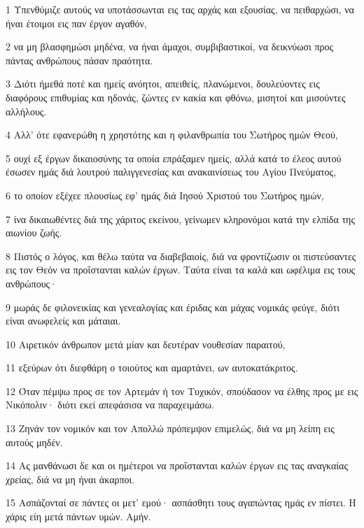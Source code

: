 \par 1 Υπενθύμιζε αυτούς να υποτάσσωνται εις τας αρχάς και εξουσίας, να πειθαρχώσι, να ήναι έτοιμοι εις παν έργον αγαθόν,
\par 2 να μη βλασφημώσι μηδένα, να ήναι άμαχοι, συμβιβαστικοί, να δεικνύωσι προς πάντας ανθρώπους πάσαν πραότητα.
\par 3 Διότι ήμεθά ποτέ και ημείς ανόητοι, απειθείς, πλανώμενοι, δουλεύοντες εις διαφόρους επιθυμίας και ηδονάς, ζώντες εν κακία και φθόνω, μισητοί και μισούντες αλλήλους.
\par 4 Αλλ' ότε εφανερώθη η χρηστότης και η φιλανθρωπία του Σωτήρος ημών Θεού,
\par 5 ουχί εξ έργων δικαιοσύνης τα οποία επράξαμεν ημείς, αλλά κατά το έλεος αυτού έσωσεν ημάς διά λουτρού παλιγγενεσίας και ανακαινίσεως του Αγίου Πνεύματος,
\par 6 το οποίον εξέχεε πλουσίως εφ' ημάς διά Ιησού Χριστού του Σωτήρος ημών,
\par 7 ίνα δικαιωθέντες διά της χάριτος εκείνου, γείνωμεν κληρονόμοι κατά την ελπίδα της αιωνίου ζωής.
\par 8 Πιστός ο λόγος, και θέλω ταύτα να διαβεβαιοίς, διά να φροντίζωσιν οι πιστεύσαντες εις τον Θεόν να προΐστανται καλών έργων. Ταύτα είναι τα καλά και ωφέλιμα εις τους ανθρώπους·
\par 9 μωράς δε φιλονεικίας και γενεαλογίας και έριδας και μάχας νομικάς φεύγε, διότι είναι ανωφελείς και μάταιαι.
\par 10 Αιρετικόν άνθρωπον μετά μίαν και δευτέραν νουθεσίαν παραιτού,
\par 11 εξεύρων ότι διεφθάρη ο τοιούτος και αμαρτάνει, ων αυτοκατάκριτος.
\par 12 Όταν πέμψω προς σε τον Αρτεμάν ή τον Τυχικόν, σπούδασον να έλθης προς με εις Νικόπολιν· διότι εκεί απεφάσισα να παραχειμάσω.
\par 13 Ζηνάν τον νομικόν και τον Απολλώ πρόπεμψον επιμελώς, διά να μη λείπη εις αυτούς μηδέν.
\par 14 Ας μανθάνωσι δε και οι ημέτεροι να προΐστανται καλών έργων εις τας αναγκαίας χρείας, διά να μη ήναι άκαρποι.
\par 15 Ασπάζονταί σε πάντες οι μετ' εμού· ασπάσθητι τους αγαπώντας ημάς εν πίστει. Η χάρις είη μετά πάντων υμών. Αμήν.



